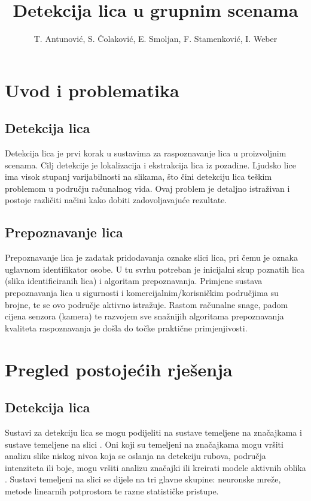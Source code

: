 \documentclass[times, utf8, seminar, numeric]{fer}
\title{Detekcija lica u grupnim scenama}
\author{T. Antunović, S. Čolaković, E. Smoljan, F. Stamenković, I. Weber}
\begin{document}
\maketitle

\tableofcontents

\chapter{Uvod i problematika}

\section{Detekcija lica}

Detekcija lica je prvi korak u sustavima za raspoznavanje lica u proizvoljnim scenama. Cilj detekcije je lokalizacija i ekstrakcija lica iz pozadine. Ljudsko lice ima visok stupanj varijabilnosti na slikama, što čini detekciju lica teškim problemom u području računalnog vida. Ovaj problem je detaljno istraživan i postoje različiti načini kako dobiti zadovoljavajuće rezultate.

\section{Prepoznavanje lica}

Prepoznavanje lica je zadatak pridodavanja oznake slici lica, pri čemu je oznaka uglavnom identifikator osobe. U tu svrhu potreban je inicijalni skup poznatih lica (slika identificiranih lica) i algoritam prepoznavanja. Primjene sustava prepoznavanja lica u sigurnosti i komercijalnim/korisničkim područjima su brojne, te se ovo područje aktivno istražuje. Rastom računalne snage, padom cijena senzora (kamera) te razvojem sve snažnijih algoritama prepoznavanja kvaliteta raspoznavanja je došla do točke praktične primjenjivosti.

\chapter{Pregled postojećih rješenja}

\section{Detekcija lica}

Sustavi za detekciju lica se mogu podijeliti na sustave temeljene na značajkama  i sustave temeljene na slici  \cite{CVIU2001:Hjelmas}. Oni koji su temeljeni na značajkama mogu vršiti analizu slike niskog nivoa koja se oslanja na detekciju rubova, područja intenziteta ili boje, mogu vršiti analizu značajki ili kreirati modele aktivnih oblika . Sustavi temeljeni na slici se dijele na tri glavne skupine: neuronske mreže, metode linearnih potprostora te razne statističke pristupe.
\end{document}

